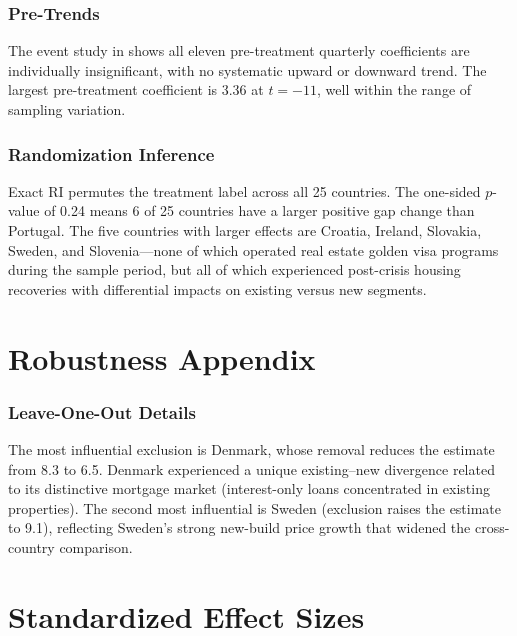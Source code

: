 \documentclass[12pt]{article}
\begin{document}
\subsubsection*{Pre-Trends} The event study in  shows all eleven pre-treatment quarterly coefficients are individually insignificant, with no systematic upward or downward trend. The largest pre-treatment coefficient is 3.36 at $t = -11$, well within the range of sampling variation.

\subsubsection*{Randomization Inference} Exact RI permutes the treatment label across all 25 countries. The one-sided $p$-value of 0.24 means 6 of 25 countries have a larger positive gap change than Portugal. The five countries with larger effects are Croatia, Ireland, Slovakia, Sweden, and Slovenia---none of which operated real estate golden visa programs during the sample period, but all of which experienced post-crisis housing recoveries with differential impacts on existing versus new segments.

\section{Robustness Appendix}

\subsubsection*{Leave-One-Out Details} The most influential exclusion is Denmark, whose removal reduces the estimate from 8.3 to 6.5. Denmark experienced a unique existing--new divergence related to its distinctive mortgage market (interest-only loans concentrated in existing properties). The second most influential is Sweden (exclusion raises the estimate to 9.1), reflecting Sweden's strong new-build price growth that widened the cross-country comparison.

\section{Standardized Effect Sizes}
\label{sec:sde}


\end{document}
